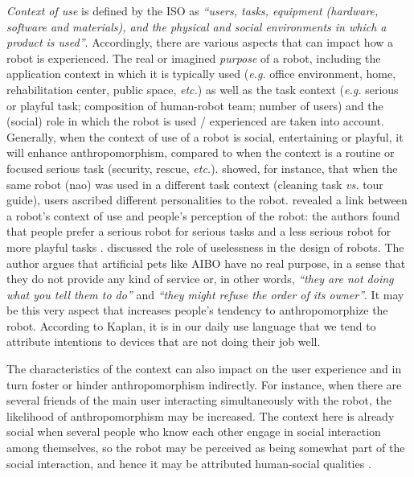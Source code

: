 \documentclass{frontiersSCNS} %
\newcommand{\eg}{\textit{e.g.}\xspace}
\newcommand{\etc}{\textit{etc.}\xspace}
\newcommand{\vs}{\textit{vs.}\xspace}
\begin{document}
\textit{Context of use} is defined by the ISO as \textit{``users, tasks,
equipment (hardware, software and materials), and the physical and social
environments in which a product is used''}. Accordingly, there are various
aspects that can impact how a robot is experienced. The real or imagined
\textit{purpose} of a robot, including the application context in which it is
typically used (\eg office environment, home, rehabilitation center, public
space, \etc) as well as the task context (\eg serious or playful task;
composition of human-robot team; number of users) and the (social) role in which
the robot is used / experienced are taken into account. Generally, when the
context of use of a robot is social, entertaining or playful, it will enhance
anthropomorphism, compared to when the context is a routine or focused serious
task (security, rescue, \etc). \cite{joosse_what_2013} showed, for instance,
that when the same robot ({\sc nao}) was used in a different task context
(cleaning task \vs tour guide), users ascribed different personalities to the
robot. \cite{goetz_cooperation_2002} revealed a link between a robot's context
of use and people's perception of the robot: the authors found that people
prefer a serious robot for serious tasks and a less serious robot for more
playful tasks . \cite{kaplan_free_2000} discussed the role of uselessness in the
design of robots. The author argues that artificial pets like AIBO have no real
purpose, in a sense that they do not provide any kind of service or, in other
words, \textit{``they are not doing what you tell them to do''} and
\textit{``they might refuse the order of its owner''}. It may be this very
aspect that increases people's tendency to anthropomorphize the robot. According
to Kaplan, it is in our daily use language that we tend to attribute intentions
to devices that are not doing their job well.

The characteristics of the context can also impact on the user experience and in
turn foster or hinder anthropomorphism indirectly. For instance, when there are
several friends of the main user interacting simultaneously with the robot, the
likelihood of anthropomorphism may be increased. The context here is already
social when several people who know each other engage in social interaction
among themselves, so the robot may be perceived as being somewhat part of the
social interaction, and hence it may be attributed human-social qualities
\citep{baxter2013do}.



%
%
%
%
%
%
\end{document}
